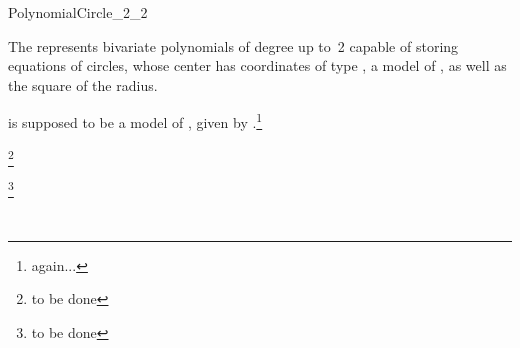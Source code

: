 \begin{ccRefConcept}{PolynomialCircle_2_2}

\ccDefinition

The  represents bivariate polynomials of degree up
to~2 capable of storing equations of circles, whose center has
coordinates of type , a model of , as 
well as the square of the radius. 

\ccTypes

 is supposed to be a model of , given 
by .\footnote{again...}

\ccCreation

\footnote{to be done}

\ccHasModels

\footnote{to be done}

\ccSeeAlso

\\

\end{ccRefConcept}
